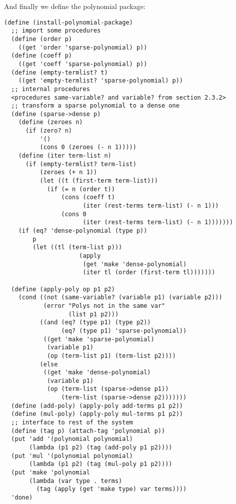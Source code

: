 \documentclass[a4paper,12pt]{article}
\begin{document}
And finally we define the polynomial package:
\begin{lstlisting}
(define (install-polynomial-package)
  ;; import some procedures
  (define (order p)
    ((get 'order 'sparse-polynomial) p))
  (define (coeff p)
    ((get 'coeff 'sparse-polynomial) p))
  (define (empty-termlist? t)
    ((get 'empty-termlist? 'sparse-polynomial) p))
  ;; internal procedures
  <procedures same-variable? and variable? from section 2.3.2>
  ;; transform a sparse polynomial to a dense one
  (define (sparse->dense p)
    (define (zeroes n)
      (if (zero? n)
          '()
          (cons 0 (zeroes (- n 1)))))
    (define (iter term-list n)
      (if (empty-termlist? term-list)
          (zeroes (+ n 1))
          (let ((t (first-term term-list)))
            (if (= n (order t))
                (cons (coeff t)
                      (iter (rest-terms term-list) (- n 1)))
                (cons 0
                      (iter (rest-terms term-list) (- n 1)))))))
    (if (eq? 'dense-polynomial (type p))
        p
        (let ((tl (term-list p)))
                     (apply
                      (get 'make 'dense-polynomial)
                      (iter tl (order (first-term tl)))))))

  (define (apply-poly op p1 p2)
    (cond ((not (same-variable? (variable p1) (variable p2)))
           (error "Polys not in the same var"
                  (list p1 p2)))
          ((and (eq? (type p1) (type p2))
                (eq? (type p1) 'sparse-polynomial))
           ((get 'make 'sparse-polynomial)
            (variable p1)
            (op (term-list p1) (term-list p2))))
          (else
           ((get 'make 'dense-polynomial)
            (variable p1)
            (op (term-list (sparse->dense p1))
                (term-list (sparse->dense p2)))))))
  (define (add-poly) (apply-poly add-terms p1 p2))
  (define (mul-poly) (apply-poly mul-terms p1 p2))
  ;; interface to rest of the system
  (define (tag p) (attach-tag 'polynomial p))
  (put 'add '(polynomial polynomial)
       (lambda (p1 p2) (tag (add-poly p1 p2))))
  (put 'mul '(polynomial polynomial)
       (lambda (p1 p2) (tag (mul-poly p1 p2))))
  (put 'make 'polynomial
       (lambda (var type . terms)
         (tag (apply (get 'make type) var terms))))
  'done)
\end{lstlisting}
\end{document}
